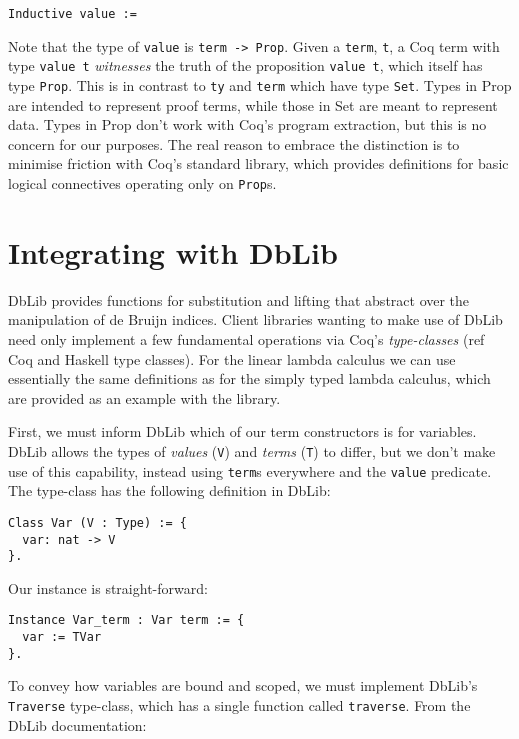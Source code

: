 \documentclass[]{unswthesis}
\let\c\texttt
\begin{document}
\begin{verbatim}
Inductive value :=
\end{verbatim}

Note that the type of \c{value} is \c{term -> Prop}. Given a \c{term}, \c{t}, a Coq term with type \c{value t} \textit{witnesses} the truth of the proposition \c{value t}, which itself has type \c{Prop}. This is in contrast to \c{ty} and \c{term} which have type \c{Set}. Types in Prop are intended to represent proof terms, while those in Set are meant to represent data. Types in Prop don't work with Coq's program extraction, but this is no concern for our purposes. The real reason to embrace the distinction is to minimise friction with Coq's standard library, which provides definitions for basic logical connectives operating only on \c{Prop}s.

\section{Integrating with DbLib}

DbLib provides functions for substitution and lifting that abstract over the manipulation of de Bruijn indices. Client libraries wanting to make use of DbLib need only implement a few fundamental operations via Coq's \textit{type-classes} (ref Coq and Haskell type classes). For the linear lambda calculus we can use essentially the same definitions as for the simply typed lambda calculus, which are provided as an example with the library.

First, we must inform DbLib which of our term constructors is for variables. DbLib allows the types of \textit{values} (\c{V}) and \textit{terms} (\c{T}) to differ, but we don't make use of this capability, instead using \c{term}s everywhere and the \c{value} predicate. The type-class has the following definition in DbLib:

\begin{verbatim}
Class Var (V : Type) := {
  var: nat -> V
}.
\end{verbatim}

Our instance is straight-forward:

\begin{verbatim}
Instance Var_term : Var term := {
  var := TVar
}.
\end{verbatim}


To convey how variables are bound and scoped, we must implement DbLib's \c{Traverse} type-class, which has a single function called \c{traverse}. From the DbLib documentation:
\end{document}
